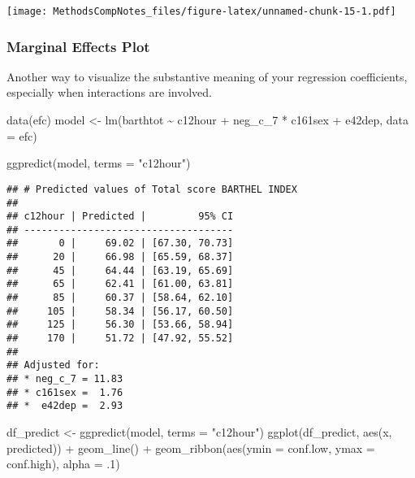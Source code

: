 \documentclass[
]{article}
\newenvironment{Shaded}{\begin{snugshade}}{\end{snugshade}}
\newcommand{\AttributeTok}[1]{\textcolor[rgb]{0.77,0.63,0.00}{#1}}
\newcommand{\DecValTok}[1]{\textcolor[rgb]{0.00,0.00,0.81}{#1}}
\newcommand{\FunctionTok}[1]{\textcolor[rgb]{0.00,0.00,0.00}{#1}}
\newcommand{\NormalTok}[1]{#1}
\newcommand{\OtherTok}[1]{\textcolor[rgb]{0.56,0.35,0.01}{#1}}
\newcommand{\SpecialCharTok}[1]{\textcolor[rgb]{0.00,0.00,0.00}{#1}}
\newcommand{\StringTok}[1]{\textcolor[rgb]{0.31,0.60,0.02}{#1}}
\begin{document}
\texttt{[image: MethodsCompNotes\_files/figure-latex/unnamed-chunk-15-1.pdf]}

\hypertarget{marginal-effects-plot}{%
\subsubsection{Marginal Effects Plot}\label{marginal-effects-plot}}

Another way to visualize the substantive meaning of your regression
coefficients, especially when interactions are involved.

\begin{Shaded}
\begin{Highlighting}[]
\FunctionTok{data}\NormalTok{(efc)}
\NormalTok{model }\OtherTok{\textless{}{-}} \FunctionTok{lm}\NormalTok{(barthtot }\SpecialCharTok{\textasciitilde{}}\NormalTok{ c12hour }\SpecialCharTok{+}\NormalTok{ neg\_c\_7 }\SpecialCharTok{*}\NormalTok{ c161sex }\SpecialCharTok{+}\NormalTok{ e42dep, }\AttributeTok{data =}\NormalTok{ efc)}

\FunctionTok{ggpredict}\NormalTok{(model, }\AttributeTok{terms =} \StringTok{"c12hour"}\NormalTok{)}
\end{Highlighting}
\end{Shaded}

\begin{verbatim}
## # Predicted values of Total score BARTHEL INDEX
## 
## c12hour | Predicted |         95% CI
## ------------------------------------
##       0 |     69.02 | [67.30, 70.73]
##      20 |     66.98 | [65.59, 68.37]
##      45 |     64.44 | [63.19, 65.69]
##      65 |     62.41 | [61.00, 63.81]
##      85 |     60.37 | [58.64, 62.10]
##     105 |     58.34 | [56.17, 60.50]
##     125 |     56.30 | [53.66, 58.94]
##     170 |     51.72 | [47.92, 55.52]
## 
## Adjusted for:
## * neg_c_7 = 11.83
## * c161sex =  1.76
## *  e42dep =  2.93
\end{verbatim}

\begin{Shaded}
\begin{Highlighting}[]
\NormalTok{df\_predict }\OtherTok{\textless{}{-}} \FunctionTok{ggpredict}\NormalTok{(model, }\AttributeTok{terms =} \StringTok{"c12hour"}\NormalTok{)}
\FunctionTok{ggplot}\NormalTok{(df\_predict, }\FunctionTok{aes}\NormalTok{(x, predicted)) }\SpecialCharTok{+}
  \FunctionTok{geom\_line}\NormalTok{() }\SpecialCharTok{+}
  \FunctionTok{geom\_ribbon}\NormalTok{(}\FunctionTok{aes}\NormalTok{(}\AttributeTok{ymin =}\NormalTok{ conf.low, }\AttributeTok{ymax =}\NormalTok{ conf.high), }\AttributeTok{alpha =}\NormalTok{ .}\DecValTok{1}\NormalTok{)}
\end{Highlighting}
\end{Shaded}
\end{document}
